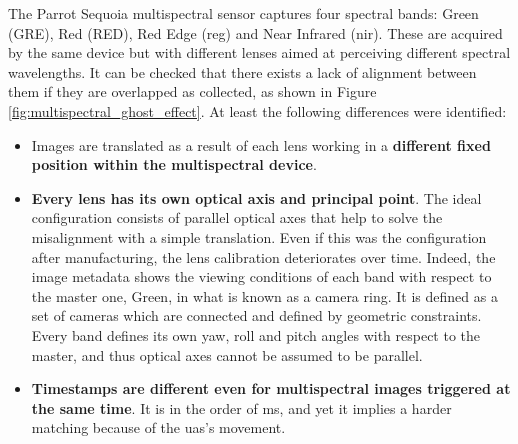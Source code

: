 The Parrot Sequoia multispectral sensor captures four spectral bands: Green (GRE), Red (RED), Red Edge (\acrshort{reg}) and Near Infrared (\acrshort{nir}). These are acquired by the same device but with different lenses aimed at perceiving different spectral wavelengths. It can be checked that there exists a lack of alignment between them if they are overlapped as collected, as shown in Figure \ref{fig:multispectral_ghost_effect}. At least the following differences were identified: 
\begin{itemize}
    \item Images are translated as a result of each lens working in a \textbf{different fixed position within the multispectral device}. 
    \item \textbf{Every lens has its own optical axis and principal point}. The ideal configuration consists of parallel optical axes that help to solve the misalignment with a simple translation. Even if this was the configuration after manufacturing, the lens calibration deteriorates over time. Indeed, the image metadata shows the viewing conditions of each band with respect to the master one, Green, in what is known as a camera ring. It is defined as a set of cameras which are connected and defined by geometric constraints. Every band defines its own yaw, roll and pitch angles with respect to the master, and thus optical axes cannot be assumed to be parallel.
    \item \textbf{Timestamps are different even for multispectral images triggered at the same time}. It is in the order of \si{\milli\second}, and yet it implies a harder matching because of the \acrshort{uas}'s movement.
\end{itemize}

